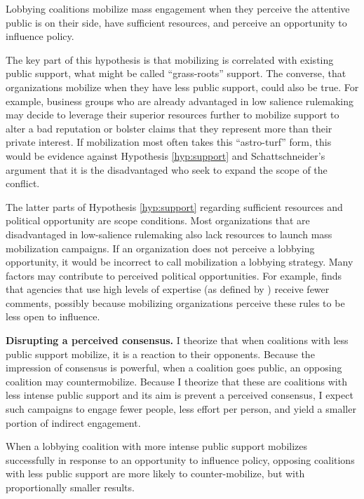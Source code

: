 \begin{subhyp}

\begin{hyp} \label{hyp:support}
Lobbying coalitions mobilize mass engagement when they perceive the attentive public is on their side, have sufficient resources, and perceive an opportunity to influence policy.
\end{hyp}

The key part of this hypothesis is that mobilizing is correlated with existing public support, what might be called ``grass-roots'' support. The converse, that organizations mobilize when they have less public support, could also be true. For example, business groups who are already advantaged in low salience rulemaking may decide to leverage their superior resources further to mobilize support to alter a bad reputation or bolster claims that they represent more than their private interest. If mobilization most often takes this ``astro-turf'' form, this would be evidence against Hypothesis \ref{hyp:support} and Schattschneider's argument that it is the disadvantaged who seek to expand the scope of the conflict. 

The latter parts of Hypothesis \ref{hyp:support} regarding sufficient resources and political opportunity are scope conditions. Most organizations that are disadvantaged in low-salience rulemaking also lack resources to launch mass mobilization campaigns. If an organization does not perceive a lobbying opportunity, it would be incorrect to call mobilization a lobbying strategy. Many factors may contribute to perceived political opportunities. For example, \citet{Moore2017} finds that agencies that use high levels of expertise (as defined by \citet{Selin2015}) receive fewer comments, possibly because mobilizing organizations perceive these rules to be less open to influence. 

\textbf{Disrupting a perceived consensus.} I theorize that when coalitions with less public support mobilize, it is a reaction to their opponents. Because the impression of consensus is powerful, when a coalition goes public, an opposing coalition may countermobilize. Because I theorize that these are coalitions with less intense public support and its aim is prevent a perceived consensus, I expect such campaigns to engage fewer people, less effort per person, and yield a smaller portion of indirect engagement. 


\begin{hyp} \label{hyp:disrupt}
When a lobbying coalition with more intense public support mobilizes successfully in response to an opportunity to influence policy, opposing coalitions with less public support are more likely to counter-mobilize, but with proportionally smaller results.
\end{hyp}


\end{subhyp}
